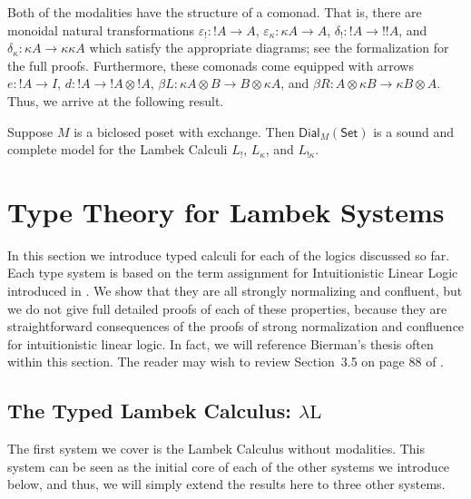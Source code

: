 \documentclass{entcs}
\let\mto\to                     %
\let\to\relax                   %
\newcommand{\to}{\rightarrow}
\newcommand{\Set}{\mathsf{Set}}
\newcommand{\Dial}[2]{\mathsf{Dial}_{#1}(#2)}
\begin{document}
Both of the modalities have the structure of a comonad.  That is,
there are monoidal natural transformations $\varepsilon_! : !A \mto
A$, $\varepsilon_\kappa : \kappa A \mto A$, $\delta_! : !A \mto !!A$,
and $\delta_\kappa : \kappa A \mto \kappa\kappa A$ which satisfy the
appropriate diagrams; see the formalization for the full
proofs. Furthermore, these comonads come equipped with arrows $e : !A
\mto I$, $d : !A \mto !A \otimes !A$, $\beta L : \kappa A \otimes B \mto B
\otimes \kappa A$, and $\beta R : A \otimes \kappa B \mto \kappa B
\otimes A$.  Thus, we arrive at the following result.

\begin{thm}
  \label{thm:sound-dial-exchange-!}
  Suppose $M$ is a biclosed poset with exchange.  Then
  $\Dial{M}{\Set}$ is a sound and complete model for the Lambek
  Calculi $L_!$, $L_\kappa$, and $L_{!\kappa}$.
\end{thm}

\section{Type Theory for Lambek Systems}
\label{sec:typed_lambek_calculi}
In this section we introduce typed calculi for each of the logics
discussed so far.  Each type system is based on the term assignment
for  Intuitionistic Linear Logic introduced 
in \cite{benton1993}.
We show that they are all strongly normalizing
and confluent, but we do not give full detailed proofs of each of
these properties, because they are straightforward consequences of the
proofs of strong normalization and confluence for intuitionistic
linear logic.  In fact, we will reference Bierman's thesis often
within this section.  The reader may wish to review Section~3.5 on
page 88 of \cite{Bierman:1994}.

\subsection{The Typed Lambek Calculus: $\lambda\text{L}$}
\label{subsec:the_typed_lambek_calculus_lambda-l}

The first system we cover is the Lambek Calculus without
modalities. This system can be seen as the initial core of each of the
other systems we introduce below, and thus, we will simply extend the
results here to three other systems.  
\end{document}
